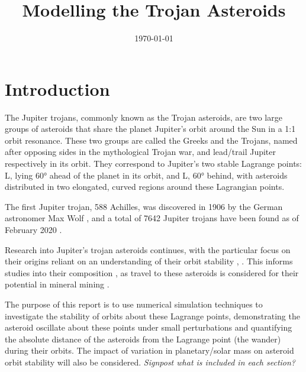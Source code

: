 \documentclass[11pt, a4paper,twocolumn]{article} %
\title{Modelling the Trojan Asteroids}
\author{\authorstyle{Christopher Gallagher} 
	\institution{University of Cambridge}}
\date{\today} %
\begin{document}
\maketitle %

\thispagestyle{firstpage} %




\section{Introduction}
The Jupiter trojans, commonly known as the Trojan asteroids, are two large groups of asteroids that share the planet Jupiter's orbit around the Sun in a 1:1 orbit resonance. These two groups are called the Greeks and the Trojans, named after opposing sides in the mythological Trojan war, and lead/trail Jupiter respectively in its orbit. They correspond to Jupiter's two stable Lagrange points: L, lying 60° ahead of the planet in its orbit, and L, 60° behind, with asteroids distributed in two elongated, curved regions around these Lagrangian points. 

The first Jupiter trojan, 588 Achilles, was discovered in 1906 by the German astronomer Max Wolf \cite{Nicholson1961}, and a total of 7642 Jupiter trojans have been found as of February 2020 \cite{IAU2020}.

Research into Jupiter's trojan asteroids continues, with the particular focus on their origins reliant on an understanding of their orbit stability \cite{DiSisto2019}, \cite{Nesvorn2018}. This informs studies into their composition \cite{Brown2016}, as travel to these asteroids is considered for their potential in mineral mining \cite{Okada2017} \cite{Levison2016}. 

The purpose of this report is to use numerical simulation techniques to investigate the stability of orbits about these Lagrange points, demonstrating the asteroid oscillate about these points under small perturbations and quantifying the absolute distance of the asteroids from the Lagrange point (the wander) during their orbits. The impact of variation in planetary/solar mass on asteroid orbit stability will also be considered. \textit{Signpost what is included in each section?}
\end{document}
